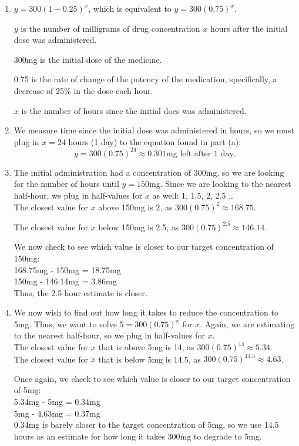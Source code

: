 \documentclass{ximera}
\begin{document}
\begin{explanation}
\begin{enumerate}
\item $y = 300(1-0.25)^x$, which is equivalent to $y = 300(0.75)^x$.

$y$ is the number of milligrams of drug concentration $x$ hours after the initial dose was administered.

300mg is the initial dose of the medicine.

0.75 is the rate of change of the potency of the medication, specifically, a decrease of 25\% in the dose each hour.

$x$ is the number of hours since the initial does was administered.

\item We measure time since the initial dose was administered in hours, so we must plug in $x=24$ hours (1 day) to the equation found in part (a):
$$y = 300(0.75)^{24} \approx 0.301 \text{mg left after 1 day.}$$

\item The initial administration had a concentration of 300mg, so we are looking for the number of hours until $y=150$mg. Since we are looking to the nearest half-hour, we plug in half-values for $x$ as well: 1, 1.5, 2, 2.5 \dots \\
The closest value for $x$ above 150mg is 2, as $300(0.75)^2 \approx 168.75$. 

The closest value for $x$ below 150mg is 2.5, as $300(0.75)^{2.5} \approx 146.14$.

We now check to see which value is closer to our target concentration of 150mg:\\
168.75mg - 150mg = 18.75mg \\
150mg - 146.14mg = 3.86mg \\
Thus, the 2.5 hour estimate is closer.

\item We now wish to find out how long it takes to reduce the concentration to 5mg. Thus, we want to solve $5 = 300(0.75)^x$ for $x$. Again, we are estimating to the nearest half-hour, so we plug in half-values for $x$.\\
The closest value for $x$ that is above 5mg is 14, as $300(0.75)^{14} \approx 5.34$.\\
The closest value for $x$ that is below 5mg is 14.5, as $300(0.75)^{14.5} \approx 4.63$.

Once again, we check to see which value is closer to our target concentration of 5mg:\\
5.34mg - 5mg = 0.34mg\\
5mg - 4.63mg = 0.37mg\\
0.34mg is barely closer to the target concentration of 5mg, so we use 14.5 hours as an estimate for how long it takes 300mg to degrade to 5mg.

\end{enumerate}
\end{explanation}
\end{document}
